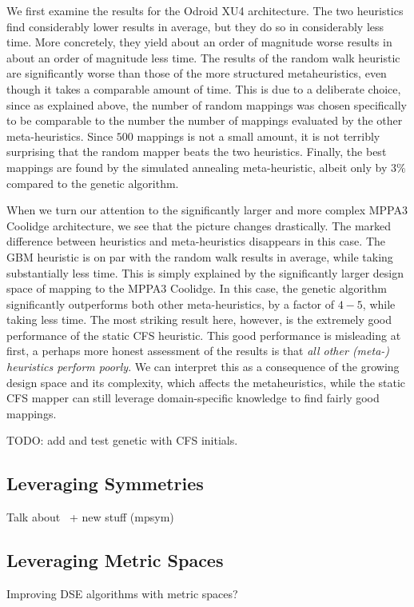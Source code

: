 We first examine the results for the Odroid XU4 architecture.
The two heuristics find considerably lower results in average, but they do so in considerably less time.
More concretely, they yield about an order of magnitude worse results in about an order of magnitude less time.
The results of the random walk heuristic are significantly worse than those of the more structured metaheuristics, even though it takes a comparable amount of time.
This is due to a deliberate choice, since as explained above, the number of random mappings was chosen specifically to be comparable to the number the number of mappings evaluated by the other meta-heuristics.
Since $500$ mappings is not a small amount, it is not terribly surprising that the random mapper beats the two heuristics.
Finally, the best mappings are found by the simulated annealing meta-heuristic, albeit only by $3\%$ compared to the genetic algorithm.

When we turn our attention to the significantly larger and more complex MPPA3 Coolidge architecture, we see that the picture changes drastically.
The marked difference between heuristics and meta-heuristics disappears in this case.
The \ac{GBM} heuristic is on par with the random walk results in average, while taking substantially less time.
This is simply explained by the significantly larger design space of mapping to the MPPA3 Coolidge.
In this case, the genetic algorithm significantly outperforms both other meta-heuristics, by a factor of $4-5$, while taking less time.
The most striking result here, however, is the extremely good performance of the static CFS heuristic.
This good performance is misleading at first, a perhaps more honest assessment of the results is that \emph{all other (meta-) heuristics perform poorly}.
We can interpret this as a consequence of the growing design space and its complexity, which affects the metaheuristics, while the static CFS mapper can still leverage domain-specific knowledge to find fairly good mappings.

TODO: add and test genetic with CFS initials.

\subsection{Leveraging Symmetries}
Talk about~\cite{goens_taco17} + new stuff (mpsym)

\subsection{Leveraging Metric Spaces}
Improving DSE algorithms with metric spaces?

